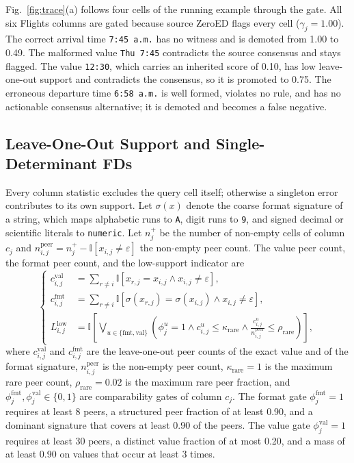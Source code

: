 \documentclass[conference]{IEEEtran}
\begin{document}
Fig.~\ref{fig:trace}(a) follows four cells of the running example through the gate. All six Flights columns are gated because source ZeroED flags every cell ($\gamma_j = 1.00$). The correct arrival time \texttt{7:45 a.m.} has no witness and is demoted from 1.00 to 0.49. The malformed value \texttt{Thu 7:45} contradicts the source consensus and stays flagged. The value \texttt{12:30}, which carries an inherited score of 0.10, has low leave-one-out support and contradicts the consensus, so it is promoted to 0.75. The erroneous departure time \texttt{6:58 a.m.} is well formed, violates no rule, and has no actionable consensus alternative; it is demoted and becomes a false negative.

\subsection{Leave-One-Out Support and Single-Determinant FDs}
\label{subsec:det_intrinsic}

Every column statistic excludes the query cell itself; otherwise a singleton error contributes to its own support. Let $\sigma(x)$ denote the coarse format signature of a string, which maps alphabetic runs to \texttt{A}, digit runs to \texttt{9}, and signed decimal or scientific literals to \texttt{numeric}. Let $n_j^{+}$ be the number of non-empty cells of column $c_j$ and $n_{i,j}^{\mathrm{peer}} = n_j^{+} - \mathbb{I}[x_{i,j} \neq \varepsilon]$ the non-empty peer count. The value peer count, the format peer count, and the low-support indicator are
\begin{equation}
\label{eq:loo_support}
\left\{
\begin{aligned}
c_{i,j}^{\mathrm{val}} &= \sum_{r \neq i} \mathbb{I}\!\left[x_{r,j} = x_{i,j} \land x_{i,j} \neq \varepsilon\right], \\
c_{i,j}^{\mathrm{fmt}} &= \sum_{r \neq i} \mathbb{I}\!\left[\sigma(x_{r,j}) = \sigma(x_{i,j}) \land x_{i,j} \neq \varepsilon\right], \\
L_{i,j}^{\mathrm{low}} &= \mathbb{I}\!\left[\bigvee_{u \in \{\mathrm{fmt}, \mathrm{val}\}} \left(\phi_j^{u} = 1 \land c_{i,j}^{u} \le \kappa_{\mathrm{rare}} \land \frac{c_{i,j}^{u}}{n_{i,j}^{\mathrm{peer}}} \le \rho_{\mathrm{rare}}\right)\right],
\end{aligned}
\right.
\end{equation}
where $c_{i,j}^{\mathrm{val}}$ and $c_{i,j}^{\mathrm{fmt}}$ are the leave-one-out peer counts of the exact value and of the format signature, $n_{i,j}^{\mathrm{peer}}$ is the non-empty peer count, $\kappa_{\mathrm{rare}} = 1$ is the maximum rare peer count, $\rho_{\mathrm{rare}} = 0.02$ is the maximum rare peer fraction, and $\phi_j^{\mathrm{fmt}}, \phi_j^{\mathrm{val}} \in \{0,1\}$ are comparability gates of column $c_j$. The format gate $\phi_j^{\mathrm{fmt}} = 1$ requires at least 8 peers, a structured peer fraction of at least 0.90, and a dominant signature that covers at least 0.90 of the peers. The value gate $\phi_j^{\mathrm{val}} = 1$ requires at least 30 peers, a distinct value fraction of at most 0.20, and a mass of at least 0.90 on values that occur at least 3 times.
\end{document}
